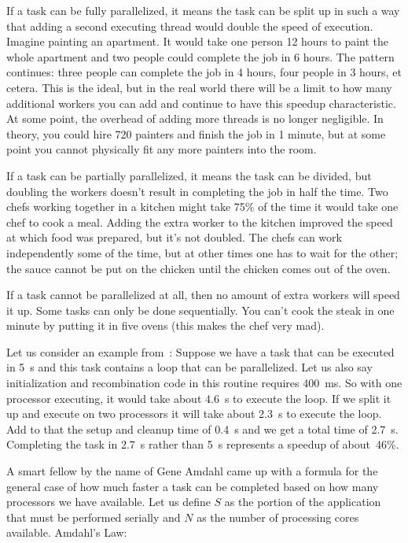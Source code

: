 If a task can be fully parallelized, it means the task can be split up in such a way that adding a second executing thread would double the speed of execution. Imagine painting an apartment. It would take one person 12 hours to paint the whole apartment and two people could complete the job in 6 hours. The pattern continues: three people can complete the job in 4 hours, four people in 3 hours, et cetera. This is the ideal, but in the real world there will be a limit to how many additional workers you can add and continue to have this speedup characteristic. At some point, the overhead of adding more threads is no longer negligible. In theory, you could hire 720 painters and finish the job in 1 minute, but at some point you cannot physically fit any more painters into the room.

If a task can be partially parallelized, it means the task can be divided, but doubling the workers doesn't result in completing the job in half the time. Two chefs working together in a kitchen might take 75\% of the time it would take one chef to cook a meal. Adding the extra worker to the kitchen improved the speed at which food was prepared, but it's not doubled. The chefs can work independently some of the time, but at other times one has to wait for the other; the sauce cannot be put on the chicken until the chicken comes out of the oven.

If a task cannot be parallelized at all, then no amount of extra workers will speed it up. Some tasks can only be done sequentially. You can't cook the steak in one minute by putting it in five ovens (this makes the chef very mad).

Let us consider an example from~\cite{mte241}: Suppose we have a task that can be executed in 5~s and this task contains a loop that can be parallelized. Let us also say initialization and recombination code in this routine requires 400~ms. So with one processor executing, it would take about 4.6~s to execute the loop. If we split it up and execute on two processors it will take about 2.3~s to execute the loop. Add to that the setup and cleanup time of 0.4~s and we get a total time of 2.7~s. Completing the task in 2.7~s rather than 5~s represents a speedup of about~46\%.

A smart fellow by the name of Gene Amdahl came up with a formula for the general case of how much faster a task can be completed based on how many processors we have available. Let us define $S$ as the portion of the application that must be performed serially and $N$ as the number of processing cores available. Amdahl's Law:

